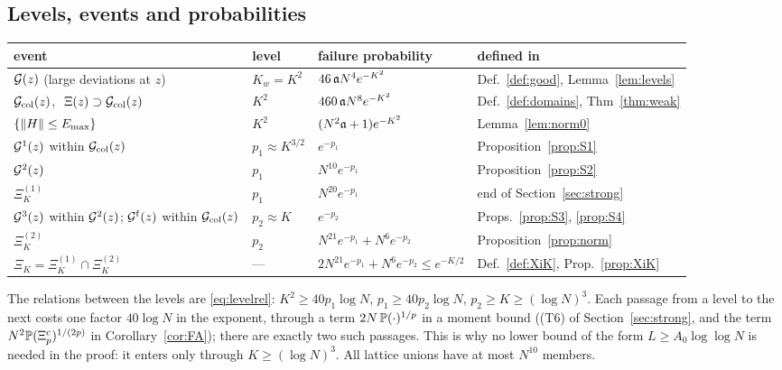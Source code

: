 \subsection{Levels, events and probabilities}\label{app:levels}
\begin{center}
\renewcommand{\arraystretch}{1.15}\small
\begin{tabular}{|p{}|p{}|p{}|p{}|}
\hline
event & level & failure probability & defined in\\\hline
$\mathcal{G}(z)$ (large deviations at $z$) & $K_w=K^2$ & $46\,\mathfrak{a} N^4e^{-K^2}$ & Def.~\ref{def:good}, Lemma~\ref{lem:levels}\\
$\mathcal{G}_{\rm col}(z)$, $\ \Xi(z)\supset\mathcal{G}_{\rm col}(z)$ & $K^2$ & $460\,\mathfrak{a} N^8e^{-K^2}$ & Def.~\ref{def:domains}, Thm~\ref{thm:weak}\\
$\{\|H\|\le E_{\max}\}$ & $K^2$ & $(N^2\mathfrak{a}+1)e^{-K^2}$ & Lemma~\ref{lem:norm0}\\
$\mathcal{G}^1(z)$ within $\mathcal{G}_{\rm col}(z)$ & $p_1\approx K^{3/2}$ & $e^{-p_1}$ & Proposition~\ref{prop:S1}\\
$\mathcal{G}^2(z)$ & $p_1$ & $N^{10}e^{-p_1}$ & Proposition~\ref{prop:S2}\\
$\Xi_K^{(1)}$ & $p_1$ & $N^{20}e^{-p_1}$ & end of Section~\ref{sec:strong}\\
$\mathcal{G}^3(z)$ within $\mathcal{G}^2(z)$; $\mathcal{G}^{\rm f}(z)$ within $\mathcal{G}_{\rm col}(z)$ & $p_2\approx K$ & $e^{-p_2}$ & Props.~\ref{prop:S3}, \ref{prop:S4}\\
$\Xi_K^{(2)}$ & $p_2$ & $N^{21}e^{-p_1}+N^6e^{-p_2}$ & Proposition~\ref{prop:norm}\\
$\Xi_K=\Xi_K^{(1)}\cap\Xi_K^{(2)}$ & --- & $2N^{21}e^{-p_1}+N^6e^{-p_2}\le e^{-K/2}$ & Def.~\ref{def:XiK}, Prop.~\ref{prop:XiK}\\\hline
\end{tabular}
\end{center}
\noindent The relations between the levels are \eqref{eq:levelrel}: $K^2\ge40p_1\log N$, $p_1\ge40p_2\log N$, $p_2\ge K\ge(\log N)^3$. Each passage from a level to the next costs one factor $40\log N$ in the exponent, through a term $2N\,\mathbb{P}(\cdot)^{1/p}$ in a moment bound ((T6) of Section~\ref{sec:strong}, and the term $N^{2}\mathbb{P}(\Xi_p^c)^{1/(2p)}$ in Corollary~\ref{cor:FA});
there are exactly two such passages. This is why no lower bound of the form $L\ge A_0\log\log N$ is needed in the proof: it enters only through $K\ge(\log N)^3$. All lattice unions have at most $N^{10}$ members.

